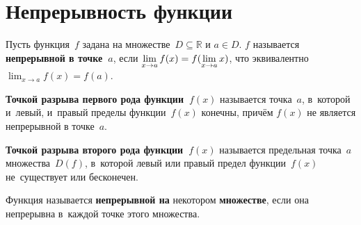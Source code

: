 \section{Непрерывность функции}
 Пусть функция~$f$ задана на множестве~$D \subseteq \mathbb R$ и $a \in D$.
$f$ называется \textbf{непрерывной в точке~$a$}, если $\displaystyle \lim_{x \to a} f(x) \opbr= f(\lim_{x \to a} x)$, что эквивалентно $\displaystyle \lim_{x \to a} f(x) = f(a)$.

 \textbf{Точкой разрыва первого рода функции~$f(x)$} называется точка~$a$, в~которой и~левый, и~правый пределы функции~$f(x)$ конечны, причём $f(x)$ не является непрерывной в точке~$a$.

\textbf{Точкой разрыва второго рода функции~$f(x)$} называется предельная точка~$a$ множества~$D(f)$, в~которой левый или правый предел функции~$f(x)$ не~существует или бесконечен.

Функция называется \textbf{непрерывной на} некотором \textbf{множестве}, если она непрерывна в~каждой точке этого множества.